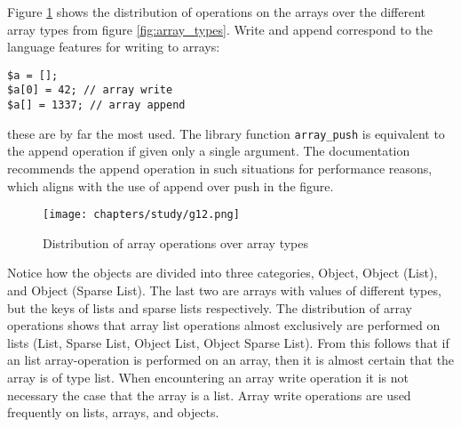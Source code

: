 Figure \ref{fig:type_operations} shows the distribution of operations on the arrays over the different array types from figure \ref{fig:array_types}. Write and append correspond to the language features for writing to arrays:
\begin{lstlisting}
$a = [];
$a[0] = 42; // array write
$a[] = 1337; // array append
\end{lstlisting}
these are by far the most used. The library function \texttt{array\_push} is equivalent to the append operation if given only a single argument. The documentation recommends the append operation in such situations for performance reasons, which aligns with the use of append over push in the figure. 

\begin{figure}
\centering
\texttt{[image: chapters/study/g12.png]}
\caption{Distribution of array operations over array types}
\label{fig:type_operations}
\end{figure}

Notice how the objects are divided into three categories, Object, Object (List), and Object (Sparse List).  The last two are arrays with values of different types, but the keys of lists and sparse lists respectively. The distribution of array operations shows that array list operations almost exclusively are performed on lists (List, Sparse List, Object List, Object Sparse List). From this follows that if an list array-operation is performed on an array, then it is almost certain that the array is of type list. When encountering an array write operation it is not necessary the case that the array is a list. Array write operations are used frequently on lists, arrays, and objects.







